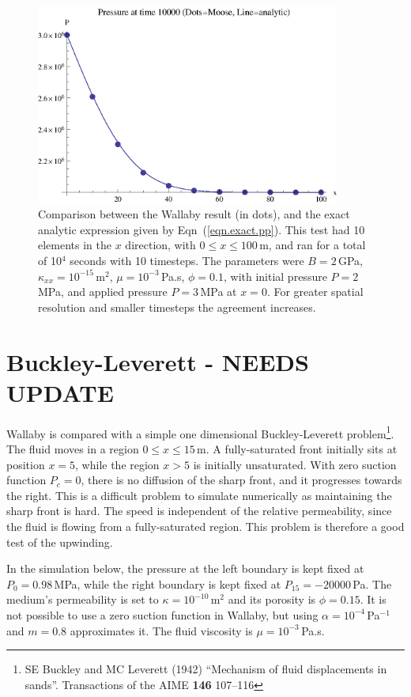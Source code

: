 \documentclass[]{scrreprt}
\begin{document}
\begin{figure}[htb]
\centering
\includegraphics[width=10cm]{pressure_pulse.eps}
\caption{Comparison between the Wallaby result (in dots), and the
  exact analytic expression given by Eqn~(\ref{eqn.exact.pp}).  This
  test had 10 elements in the $x$ direction, with $0\leq x \leq
  100$\,m, and ran for a total of 
  10$^4$ seconds with 10 timesteps.  The parameters were $B=2$\,GPa,
  $\kappa_{xx}=10^{-15}$\,m$^{2}$, $\mu=10^{-3}$\,Pa.s, $\phi=0.1$,
  with initial pressure $P=2$\,MPa, and applied pressure $P=3$\,MPa at
  $x=0$.  For greater spatial resolution and smaller timesteps the
  agreement increases.}
\label{pressure_pulse.fig}
\end{figure}


\chapter{Buckley-Leverett - NEEDS UPDATE}

Wallaby is compared with a simple one dimensional
Buckley-Leverett problem\footnote{SE Buckley and MC Leverett (1942)
  ``Mechanism of fluid displacements in sands''.  Transactions of the
  AIME {\bf 146} 107--116}.  The fluid moves in a region $0\leq x\leq
15$\,m.  A fully-saturated front initially sits at position $x=5$,
while the region $x>5$ is initially unsaturated.  With zero suction
function $P_{c} = 0$, there is no diffusion of the sharp front, and it
progresses towards the right.  This is a difficult problem to simulate
numerically as maintaining the sharp front is hard.  The speed is
independent of the 
relative permeability, since the fluid is flowing from a
fully-saturated region.  This problem is therefore a good test of the upwinding.


In the simulation below, the pressure at the left boundary is kept
fixed at $P_{0}=0.98$\,MPa, while the right boundary is kept fixed at
$P_{15}=-20000$\,Pa.  The medium's permeability is set to $\kappa =
10^{-10}\,\mathrm{m}^{2}$ and its porosity is $\phi = 0.15$.  It is
not possible to use a zero suction function in Wallaby, but using
$\alpha = 10^{-4}$\,Pa$^{-1}$ and $m=0.8$ approximates it.  The fluid
viscosity is $\mu = 10^{-3}$\,Pa.s.
\end{document}
